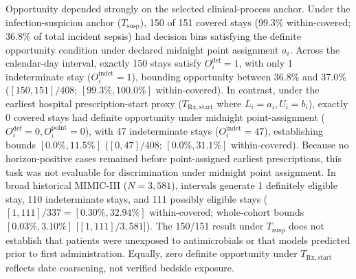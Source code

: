 \documentclass[10pt,twocolumn,a4paper]{article}
\begin{document}
Opportunity depended strongly on the selected clinical-process anchor. Under the infection-suspicion anchor ($T_{\mathrm{susp}}$), 150 of 151 covered stays (99.3\% within-covered; 36.8\% of total incident sepsis) had decision bins satisfying the definite opportunity condition under declared midnight point assignment $a_i$. Across the calendar-day interval, exactly 150 stays satisfy $O_i^{\mathrm{def}} = 1$, with only 1 indeterminate stay ($O_i^{\mathrm{indet}} = 1$), bounding opportunity between 36.8\% and 37.0\% ($[150, 151]/408$; $[99.3\%, 100.0\%]$ within-covered). In contrast, under the earliest hospital prescription-start proxy ($T_{\mathrm{Rx,start}}$ where $L_i=a_i, U_i=b_i$), exactly 0 covered stays had definite opportunity under midnight point-assignment ($O_i^{\mathrm{def}} = 0, O_i^{\mathrm{point}} = 0$), with 47 indeterminate stays ($O_i^{\mathrm{indet}} = 47$), establishing bounds $[0.0\%, 11.5\%]$ ($[0, 47]/408$; $[0.0\%, 31.1\%]$ within-covered). Because no horizon-positive cases remained before point-assigned earliest prescriptions, this task was not evaluable for discrimination under midnight point assignment. In broad historical MIMIC-III ($N=3,581$), intervals generate 1 definitely eligible stay, 110 indeterminate stays, and 111 possibly eligible stays ($[1, 111]/337 = [0.30\%, 32.94\%]$ within-covered; whole-cohort bounds $[0.03\%, 3.10\%]$ [$[1, 111]/3,581$]). The 150/151 result under $T_{\mathrm{susp}}$ does not establish that patients were unexposed to antimicrobials or that models predicted prior to first administration. Equally, zero definite opportunity under $T_{\mathrm{Rx,start}}$ reflects date coarsening, not verified bedside exposure.
\end{document}
